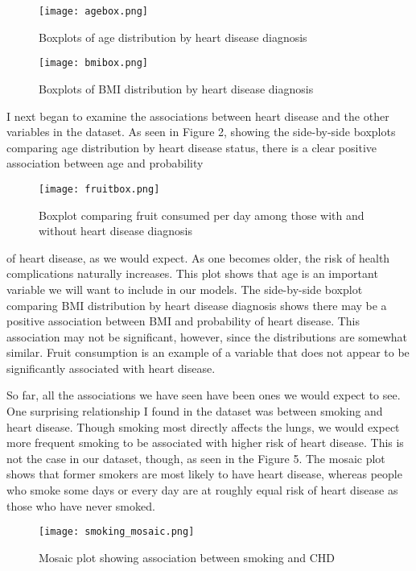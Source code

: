 \documentclass[12pt]{article}
\begin{document}
\begin{figure}[h!]
\centering
\begin{minipage}{.5\textwidth}
  \centering
  \texttt{[image: agebox.png]}
  \caption{\centering Boxplots of age distribution by heart disease diagnosis}
  \label{fig:test1}
\end{minipage}%
\begin{minipage}{.5\textwidth}
  \centering
  \texttt{[image: bmibox.png]}
  \caption{\centering Boxplots of BMI distribution by heart disease diagnosis}
  \label{fig:test2}
\end{minipage}
\end{figure}

I next began to examine the associations between heart disease and the other variables in the dataset. As seen in Figure 2, showing the side-by-side boxplots comparing age distribution by heart disease status, there is a clear positive association between age and probability
\begin{wrapfigure}[22]{r}{0.5\textwidth}
\centering
\texttt{[image: fruitbox.png]} 
\caption{\centering Boxplot comparing fruit consumed per day among those with and without heart disease diagnosis}
\label{fruitbox}
\end{wrapfigure}%
of heart disease, as we would expect. As one becomes older, the risk of health complications naturally increases. This plot shows that age is an important variable we will want to include in our models. The side-by-side boxplot comparing BMI distribution by heart disease diagnosis shows there may be a positive association between BMI and probability of heart disease. This association may not be significant, however, since the distributions are somewhat similar. Fruit consumption is an example of a variable that does not appear to be significantly associated with heart disease.

So far, all the associations we have seen have been ones we would expect to see. One surprising relationship I found in the dataset was between smoking and heart disease. Though smoking most directly affects the lungs, we would expect more frequent smoking to be associated with higher risk of heart disease. This is not the case in our dataset, though, as seen in the Figure 5. The mosaic plot shows that former smokers are most likely to have heart disease, whereas people who smoke some days or every day are at roughly equal risk of heart disease as those who have never smoked.
\begin{figure}[h!]
\centering
\texttt{[image: smoking\_mosaic.png]}
\caption{Mosaic plot showing association between smoking and CHD}
\end{figure}
\end{document}
